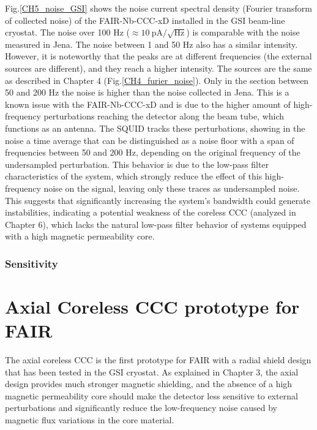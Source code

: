 \documentclass[12pt,a4paper]{report}
\begin{document}
        Fig.\ref{CH5_noise_GSI} shows the noise current spectral density (Fourier transform of collected noise) of the FAIR-Nb-CCC-xD installed in the GSI beam-line cryostat. The noise over 100 Hz ($\approx \SI{10}{\pico\ampere}/\sqrt{\text{Hz}}$) is comparable with the noise measured in Jena. The noise between 1 and 50 Hz also has a similar intensity. However, it is noteworthy that the peaks are at different frequencies (the external sources are different), and they reach a higher intensity. The sources are the same as described in Chapter 4 (Fig.\ref{CH4_furier_noise}).
        Only in the section between 50 and 200 Hz the noise is higher than the noise collected in Jena. This is a known issue with the FAIR-Nb-CCC-xD and is due to the higher amount of high-frequency perturbations reaching the detector along the beam tube, which functions as an antenna. The SQUID tracks these perturbations, showing in the noise a time average that can be distinguished as a noise floor with a span of frequencies between 50 and 200 Hz, depending on the original frequency of the undersampled perturbation. This behavior is due to the low-pass filter characteristics of the system, which strongly reduce the effect of this high-frequency noise on the signal, leaving only these traces as undersampled noise. 
        This suggests that significantly increasing the system's bandwidth could generate instabilities, indicating a potential weakness of the coreless CCC (analyzed in Chapter 6), which lacks the natural low-pass filter behavior of systems equipped with a high magnetic permeability core.
        
        
        \subsection{Sensitivity}
        
        
        
        
        
        
        
        
        
        
        
        
        \chapter{Axial Coreless CCC prototype for FAIR}
        The axial coreless CCC is the first prototype for FAIR with a radial shield design that has been tested in the GSI cryostat. As explained in Chapter 3, the axial design provides much stronger magnetic shielding, and the absence of a high magnetic permeability core should make the detector less sensitive to external perturbations and significantly reduce the low-frequency noise caused by magnetic flux variations in the core material.
        
\end{document}
